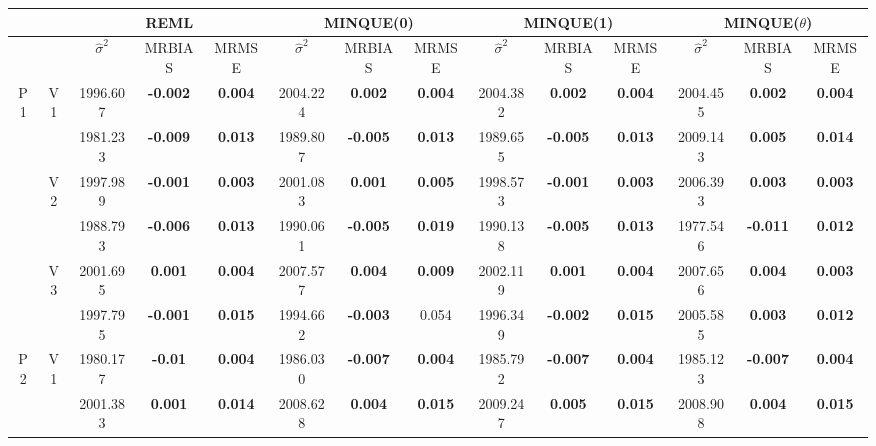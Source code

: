 \documentclass[12pt,a4paper]{article}
\begin{document}
\begin{sidewaystable}[H]
\centering
{\footnotesize
\begin{tabular}{cc|ccc|ccc|ccc|ccc|}
   & & \multicolumn{3}{c|}{REML}&\multicolumn{3}{c|}{MINQUE(0)}&\multicolumn{3}{c|}{MINQUE(1)}&\multicolumn{3}{c|}{MINQUE($\theta$)}\\ \hline
 &  & $\hat{\sigma}^2$ & MRBIAS & MRMSE & $\hat{\sigma}^2$ & MRBIAS & MRMSE & $\hat{\sigma}^2$ & MRBIAS & MRMSE & $\hat{\sigma}^2$ & MRBIAS & MRMSE \\ 
  \hline
\multirow{6}{*}{P1} & \multirow{2}{*}{V1} & 1996.607 & \textbf{-0.002} & \textbf{0.004} & 2004.224 & \textbf{0.002} & \textbf{0.004} & 2004.382 & \textbf{0.002} & \textbf{0.004} & 2004.455 & \textbf{0.002} & \textbf{0.004} \\ 
   &  & 1981.233 & \textbf{-0.009} & \textbf{0.013} & 1989.807 & \textbf{-0.005} & \textbf{0.013} & 1989.655 & \textbf{-0.005} & \textbf{0.013} & 2009.143 & \textbf{0.005} & \textbf{0.014} \\ 
   & \multirow{2}{*}{V2} & 1997.989 & \textbf{-0.001} & \textbf{0.003} & 2001.083 & \textbf{0.001} & \textbf{0.005} & 1998.573 & \textbf{-0.001} & \textbf{0.003} & 2006.393 & \textbf{0.003} & \textbf{0.003} \\ 
   &  & 1988.793 & \textbf{-0.006} & \textbf{0.013} & 1990.061 & \textbf{-0.005} & \textbf{0.019} & 1990.138 & \textbf{-0.005} & \textbf{0.013} & 1977.546 & \textbf{-0.011} & \textbf{0.012} \\ 
   & \multirow{2}{*}{V3} & 2001.695 & \textbf{0.001} & \textbf{0.004} & 2007.577 & \textbf{0.004} & \textbf{0.009} & 2002.119 & \textbf{0.001} & \textbf{0.004} & 2007.656 & \textbf{0.004} & \textbf{0.003} \\ 
   &  & 1997.795 & \textbf{-0.001} & \textbf{0.015} & 1994.662 & \textbf{-0.003} & 0.054 & 1996.349 & \textbf{-0.002} & \textbf{0.015} & 2005.585 & \textbf{0.003} & \textbf{0.012} \\ 
   \hline \hline\multirow{6}{*}{P2} & \multirow{2}{*}{V1} & 1980.177 & \textbf{-0.01} & \textbf{0.004} & 1986.030 & \textbf{-0.007} & \textbf{0.004} & 1985.792 & \textbf{-0.007} & \textbf{0.004} & 1985.123 & \textbf{-0.007} & \textbf{0.004} \\ 
   &  & 2001.383 & \textbf{0.001} & \textbf{0.014} & 2008.628 & \textbf{0.004} & \textbf{0.015} & 2009.247 & \textbf{0.005} & \textbf{0.015} & 2008.908 & \textbf{0.004} & \textbf{0.015} \\ 

\end{tabular}}
\end{sidewaystable}
\end{document}
